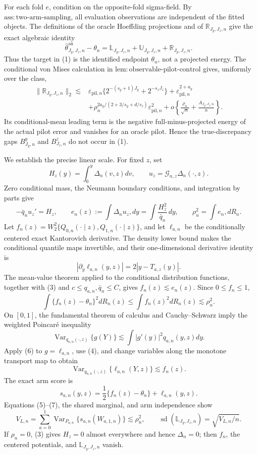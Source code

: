 For each fold \(e\), condition on the opposite-fold sigma-field.  By \(\mathrm{ass{:}two\text{-}arm\text{-}sampling}\), all evaluation observations are independent of the fitted objects.  The definitions of the oracle Hoeffding projections and of \(\mathbb R_{J_y,J_z,n}\) give the exact algebraic identity
\[
\widehat\theta^{\mathrm{an}}_{J_y,J_z,n}-\theta_n
=\mathbb L_{J_y,J_z,n}+\mathbb U_{J_y,J_z,n}+\mathbb R_{J_y,J_z,n}. \tag{1}
\]
Thus the target in (1) is the identified endpoint \(\theta_n\), not a projected energy.  The conditional von Mises calculation in \(\mathrm{lem{:}observable\text{-}pilot\text{-}control}\) gives, uniformly over the class,
\begin{equation}
\begin{split}
\|\mathbb R_{J_y,J_z,n}\|_2\lesssim{}&
\varepsilon_{\mathrm{pil},n}\{2^{-(s_y+1)J_y}+2^{-s_zJ_z}\}
+\varepsilon_{\mathrm{pil},n}^{2+a_y}\\
&+\rho_n^{2a_y/(2+3/s_y+d/s_z)}\varepsilon_{\mathrm{pil},n}^{2}
+o\!\left\{\frac{\rho_n}{\sqrt n}+\frac{A_{J_y,J_z,n}}n\right\}.
\end{split}
\tag{2}\end{equation}
Its conditional-mean leading term is the negative full-minus-projected energy of the actual pilot error and vanishes for an oracle pilot.  Hence the true-discrepancy gaps \(B^y_{J_y,n}\) and \(B^z_{J_z,n}\) do not occur in (1).

We establish the precise linear scale.  For fixed \(z\), set
\[
H_z(y)=\int_0^y\Delta_n(v,z)dv,
\qquad u_z=\mathcal G_{n,z}\Delta_n(\cdot,z).
\]
Zero conditional mass, the Neumann boundary conditions, and integration by parts give
\[
-\bar q_nu_z'=H_z,
\qquad
e_n(z):=\int\Delta_nu_z,dy
=\int\frac{H_z^2}{\bar q_n}\,dy,
\qquad \rho_n^2=\int e_n,dR_n. \tag{3}
\]
Let \(f_n(z)=W_2^2\{Q_{0,n}(\cdot\mid z),Q_{1,n}(\cdot\mid z)\}\), and let \(\ell_{a,n}\) be the conditionally centered exact Kantorovich derivative.  The density lower bound makes the conditional quantile maps invertible, and their one-dimensional derivative identity is
\[
|\partial_y\ell_{a,n}(y,z)|=2|y-T_{a,z}(y)|. \tag{4}
\]
The mean-value theorem applied to the conditional distribution functions, together with (3) and \(c\le q_{a,n},\bar q_n\le C\), gives \(f_n(z)\lesssim e_n(z)\).  Since \(0\le f_n\le1\),
\[
\int\{f_n(z)-\theta_n\}^2dR_n(z)\le\int f_n(z)^2dR_n(z)\lesssim\rho_n^2. \tag{5}
\]
On \([0,1]\), the fundamental theorem of calculus and Cauchy--Schwarz imply the weighted Poincar\'e inequality
\[
\operatorname{Var}_{q_{a,n}(\cdot,z)}\{g(Y)\}
\lesssim\int|g'(y)|^2q_{a,n}(y,z)dy. \tag{6}
\]
Apply (6) to \(g=\ell_{a,n}\), use (4), and change variables along the monotone transport map to obtain
\[
\operatorname{Var}_{q_{a,n}(\cdot,z)}\{\ell_{a,n}(Y,z)\}\lesssim f_n(z). \tag{7}
\]
The exact arm score is
\[
s_{a,n}(y,z)=\frac12\{f_n(z)-\theta_n\}+\ell_{a,n}(y,z).
\]
Equations (5)--(7), the shared marginal, and arm independence show
\[
V_{L,n}=\sum_{a=0}^1\operatorname{Var}_{P_{a,n}}\{s_{a,n}(W_{a,1,n})\}
\lesssim\rho_n^2,
\qquad
\operatorname{sd}(\mathbb L_{J_y,J_z,n})=\sqrt{V_{L,n}/n}. \tag{8}
\]
If \(\rho_n=0\), (3) gives \(H_z=0\) almost everywhere and hence \(\Delta_n=0\); then \(f_n\), the centered potentials, and \(\mathbb L_{J_y,J_z,n}\) vanish.

